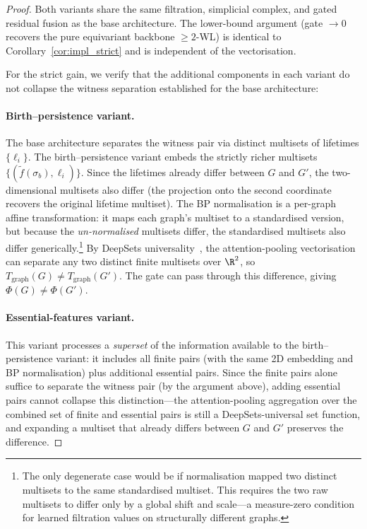 \begin{proof}
Both variants share the same filtration, simplicial complex, and gated residual fusion as the base architecture. The lower-bound argument (gate $\to 0$ recovers the pure equivariant backbone $\geq 2$-WL) is identical to Corollary~\ref{cor:impl_strict} and is independent of the vectorisation.

For the strict gain, we verify that the additional components in each variant do not collapse the witness separation established for the base architecture:

\paragraph{Birth--persistence variant.}
The base architecture separates the witness pair via distinct multisets of lifetimes $\{\ell_i\}$. The birth--persistence variant embeds the strictly richer multisets $\{(\tilde{f}(\sigma_b), \ell_i)\}$. Since the lifetimes already differ between $G$ and $G'$, the two-dimensional multisets also differ (the projection onto the second coordinate recovers the original lifetime multiset). The BP normalisation is a per-graph affine transformation: it maps each graph's multiset to a standardised version, but because the \emph{un-normalised} multisets differ, the standardised multisets also differ generically.\footnote{The only degenerate case would be if normalisation mapped two distinct multisets to the same standardised multiset. This requires the two raw multisets to differ only by a global shift and scale---a measure-zero condition for learned filtration values on structurally different graphs.} By DeepSets universality~\cite{zaheer2017deep}, the attention-pooling vectorisation can separate any two distinct finite multisets over $\R^2$, so $T_{\mathrm{graph}}(G) \neq T_{\mathrm{graph}}(G')$. The gate can pass through this difference, giving $\Phi(G) \neq \Phi(G')$.

\paragraph{Essential-features variant.}
This variant processes a \emph{superset} of the information available to the birth--persistence variant: it includes all finite pairs (with the same 2D embedding and BP normalisation) plus additional essential pairs. Since the finite pairs alone suffice to separate the witness pair (by the argument above), adding essential pairs cannot collapse this distinction---the attention-pooling aggregation over the combined set of finite and essential pairs is still a DeepSets-universal set function, and expanding a multiset that already differs between $G$ and $G'$ preserves the difference.


\end{proof}
